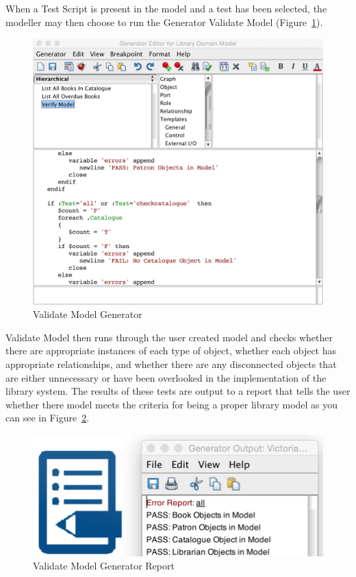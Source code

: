 When a Test Script is present in the model and a test has been selected, the modeller may then choose to run the Generator Validate Model (Figure~\ref{fig:transform_code}).\par
  \begin{figure}[h]
    \centering
    \includegraphics[scale=0.3]{images/transform_code.png}
    \caption{Validate Model Generator}
    \label{fig:transform_code}
  \end{figure} 
Validate Model then runs through the user created model and checks whether there are appropriate instances of each type of object, whether each object has appropriate relationships, and whether there are any disconnected objects that are either unnecessary or have been overlooked in the implementation of the library system.  The results of these tests are output to a report that tells the user whether there model meets the criteria for being a proper library model as you can see in Figure~\ref{fig:transform_report}.\par
  \begin{figure}[h]
    \centering
    \includegraphics[scale=0.3]{images/transform_all.png}
    \caption{Validate Model Generator Report}
    \label{fig:transform_report}
  \end{figure} 

